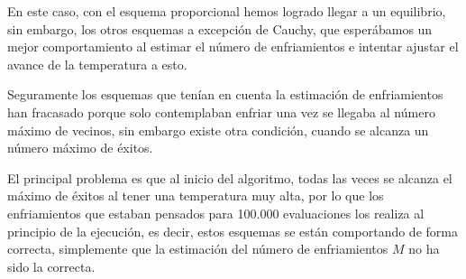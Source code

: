 \documentclass[12pt, spanish]{article}
\begin{document}
En este caso, con el esquema proporcional hemos logrado llegar a un equilibrio, sin embargo, los otros esquemas a excepción de Cauchy, que esperábamos un mejor comportamiento al estimar el número de enfriamientos e intentar ajustar el avance de la temperatura a esto.

Seguramente los esquemas que tenían en cuenta la estimación de enfriamientos han fracasado porque solo contemplaban enfriar una vez se llegaba al número máximo de vecinos, sin embargo existe otra condición, cuando se alcanza un número máximo de éxitos. 

El principal problema es que al inicio del algoritmo, todas las veces se alcanza el máximo de éxitos al tener una temperatura muy alta, por lo que los enfriamientos que estaban pensados para 100.000 evaluaciones los realiza al principio de la ejecución, es decir, estos esquemas se están comportando de forma correcta, simplemente que la estimación del número de enfriamientos $M$ no ha sido la correcta.
\end{document}
